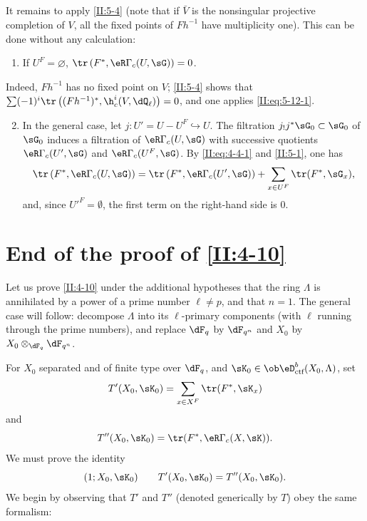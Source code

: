 \subsection{}\label{II:5-13}

It remains to apply \ref{II:5-4} (note that if $\bar V$ is the nonsingular
projective completion of $V$, all the fixed points of $F h^{-1}$ have
multiplicity one). This can be done without any calculation:
\begin{enumerate}[\indent A.]
  \item If $U^F=\varnothing$,
    $\tr\left(F^*,\eR\Gamma_c(U,\sG)\right) = 0$. \end{enumerate}

Indeed, $F h^{-1}$ has no fixed point on $V$; \ref{II:5-4} shows that
$\sum (-1)^i \tr\left((F h^{-1})^*,\h_c^i(V,\dQ_\ell)\right)=0$, and one
applies \eqref{II:eq:5-12-1}.
\begin{enumerate}[\indent A.]
\setcounter{enumi}{1}
  \item {}In the general case, let $j:U'=U-U^F\hookrightarrow U$.
    The filtration $j_! j^* \sG_0\subset \sG_0$ of $\sG_0$ induces a
    filtration of $\eR\Gamma_c(U,\sG)$ with successive quotients
    $\eR\Gamma_c(U',\sG)$ and $\eR\Gamma_c(U^F,\sG)$. By
    \eqref{II:eq:4-4-1} and \ref{II:5-1}, one has
    \[
      \tr\left(F^*,\eR\Gamma_c(U,\sG)\right) = \tr\left(F^*,\eR\Gamma_c(U',\sG)\right) + \sum_{x\in U^F} \tr(F^*,\sG_x) \text{,}
    \]
    and, since ${U'}^F=\emptyset$, the first term on the right-hand side is $0$.
\end{enumerate}











\section{End of the proof of \ref{II:4-10}}\label{II:6}

Let us prove \ref{II:4-10} under the additional hypotheses that the ring
$\Lambda$ is annihilated by a power of a prime number $\ell\ne p$, and that
$n=1$. The general case will follow: decompose $\Lambda$ into its
$\ell$-primary components (with $\ell$ running through the prime numbers),
and replace $\dF_q$ by $\dF_{q^n}$ and $X_0$ by
$X_0\otimes_{\dF_q}\dF_{q^n}$.

For $X_0$ separated and of finite type over $\dF_q$, and
$\sK_0\in\ob\eD_\text{ctf}^b(X_0,\Lambda)$, set
\[
  T'(X_0,\sK_0) = \sum_{x\in X^F} \tr(F^*,\sK_x)
\]
and
\[
  T''(X_0,\sK_0) = \tr(F^*,\eR\Gamma_c(X,\sK)) \text{.}
\]
We must prove the identity
\[
  (1;X_0,\sK_0) \qquad T'(X_0,\sK_0) = T''(X_0,\sK_0) \text{.}
\]
We begin by observing that $T'$ and $T''$ (denoted generically by $T$) obey
the same formalism:

